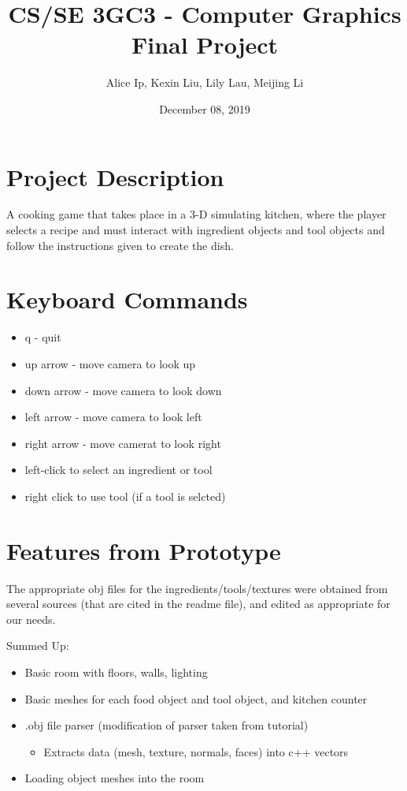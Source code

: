 \documentclass[11pt]{article}
\author{Alice Ip, Kexin Liu, Lily Lau, Meijing Li}
\date{December 08, 2019}
\title{CS/SE 3GC3 - Computer Graphics Final Project}
\begin{document}
\maketitle

\section*{Project Description}
\label{sec:org1d8940a}
A cooking game that takes place in a 3-D simulating kitchen,
 where the player selects a recipe and must interact with
 ingredient objects and tool objects and follow the instructions
 given to create the dish.

\section*{Keyboard Commands}
\label{sec:orgd56cdd5}
\begin{itemize}
\item q - quit

\item up arrow - move camera to look up
\item down arrow - move camera to look down
\item left arrow - move camera to look left
\item right arrow - move camerat to look right

\item left-click to select an ingredient or tool
\item right click to use tool (if a tool is selcted)
\end{itemize}


\section*{Features from Prototype}
\label{sec:orgf8f58d8}
The appropriate obj files for the ingredients/tools/textures
were obtained from several sources (that are cited in the
readme file), and edited as appropriate for our needs. 

Summed Up:
\begin{itemize}
\item Basic room with floors, walls, lighting
\item Basic meshes for each food object and tool object, and kitchen counter
\item .obj file parser (modification of parser taken from tutorial)
\begin{itemize}
\item Extracts data (mesh, texture, normals, faces) into c++ vectors
\end{itemize}
\item Loading object meshes into the room
\end{itemize}
\end{document}
